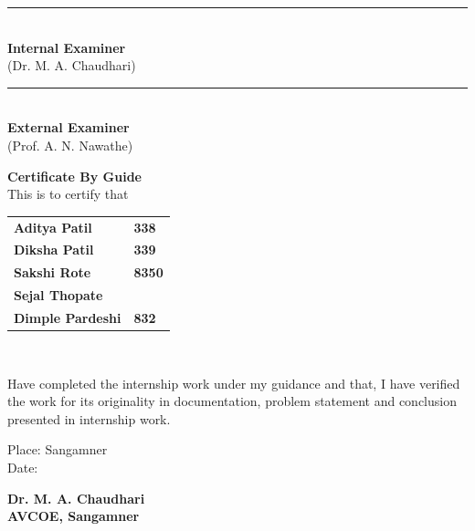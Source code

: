 \documentclass[12pt,a4paper]{report}
\begin{document}
\noindent
\begin{minipage}[t]{0.5\textwidth}
\begin{flushleft}
\rule{6cm}{0.4pt} \\[0.2cm]
\textbf{Internal Examiner} \\
(Dr. M. A. Chaudhari)
\end{flushleft}
\end{minipage}
\begin{minipage}[t]{0.5\textwidth}
\begin{flushright}
\rule{6cm}{0.4pt} \\[0.2cm]
\textbf{External Examiner} \\
(Prof. A. N. Nawathe)
\end{flushright}
\end{minipage}

\newpage
\thispagestyle{empty}
\vspace*{1.5cm}
\begin{center}
\textbf{\Large Certificate By Guide} \\[0.8cm]
This is to certify that \\[0.5cm]

\begin{tabular}{ll}
\textbf{Aditya Patil} & \textbf{338} \\
\textbf{Diksha Patil} & \textbf{339} \\
\textbf{Sakshi Rote} & \textbf{8350} \\
\textbf{Sejal Thopate} & \\
\textbf{Dimple Pardeshi} & \textbf{832} \\
\end{tabular} \\[1cm]
\end{center}

\noindent Have completed the internship work under my guidance and that, I have verified the work for its originality in documentation, problem statement and conclusion presented in internship work. \\[2cm]

\noindent
\begin{minipage}[t]{0.5\textwidth}
\begin{flushleft}
Place: Sangamner \\
Date:
\end{flushleft}
\end{minipage}
\begin{minipage}[t]{0.5\textwidth}
\begin{flushright}
\textbf{Dr. M. A. Chaudhari} \\[0.2cm]
\textbf{AVCOE, Sangamner}
\end{flushright}
\end{minipage}
\end{document}
